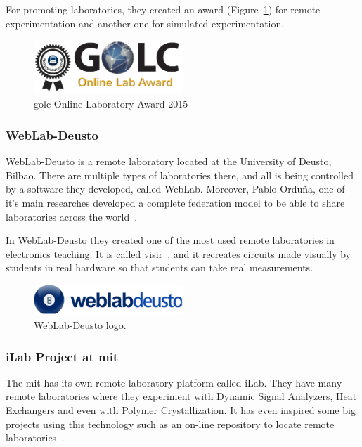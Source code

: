 For promoting laboratories, they created an award (Figure~\ref{fig:golc_award}) for remote
experimentation and another one for simulated experimentation.

\begin{figure}[!htbp]
	\centering
	\includegraphics[width=0.5\textwidth]{fig/golc_award}
	\caption{\acrshort{golc} Online Laboratory Award 2015}\label{fig:golc_award}
\end{figure}

\subsubsection{WebLab-Deusto}

WebLab-Deusto is a remote laboratory located at the University of Deusto, Bilbao. There are multiple
types of laboratories there, and all is being controlled by a software they developed, called
WebLab. Moreover, Pablo Orduña, one of it's main researches developed a complete federation model
to be able to share laboratories across the world~\cite{porduna_phd}.

In WebLab-Deusto they created one of the most used remote laboratories in electronics teaching. It
is called \acrshort{visir}~\cite{visir}, and it recreates circuits made visually by students in real
hardware so that students can take real measurements.

\begin{figure}[!htbp]
	\centering
	\includegraphics[width=0.5\textwidth]{fig/weblab}
	\caption{WebLab-Deusto logo.}
\end{figure}

\subsubsection{iLab Project at \acrshort{mit}}

The \acrlong{mit} has its own remote laboratory platform called iLab. They
have many remote laboratories where they experiment with Dynamic Signal Analyzers, Heat Exchangers
and even with Polymer Crystallization. It has even inspired some big projects using this technology
such as an on-line repository to locate remote laboratories~\cite{ilabs_multi}.

